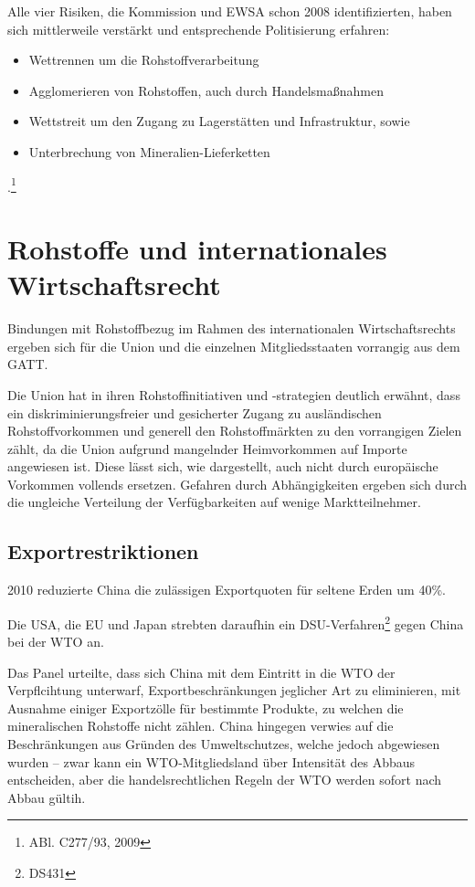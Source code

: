 \documentclass[12pt,a4paper,oneside]{book} %
\begin{document}
{	Alle vier Risiken, die Kommission und EWSA schon 2008 identifizierten, haben sich mittlerweile verstärkt und entsprechende Politisierung erfahren:
	\begin{itemize}
		\item Wettrennen um die Rohstoffverarbeitung
		\item Agglomerieren von Rohstoffen, auch durch Handelsmaßnahmen
		\item Wettstreit um den Zugang zu Lagerstätten und Infrastruktur, sowie
		\item Unterbrechung von Mineralien-Lieferketten
	\end{itemize}
	.\footnote{ABl. C277/93, 2009}
	
	
	
	
	\section{Rohstoffe und internationales Wirtschaftsrecht}
	Bindungen mit Rohstoffbezug im Rahmen des internationalen Wirtschaftsrechts ergeben sich für die Union und die einzelnen Mitgliedsstaaten vorrangig aus dem GATT.
	
	Die Union hat in ihren Rohstoffinitiativen und -strategien deutlich erwähnt, dass ein diskriminierungsfreier und gesicherter Zugang zu ausländischen Rohstoffvorkommen und generell den Rohstoffmärkten zu den vorrangigen Zielen zählt, da die Union aufgrund mangelnder Heimvorkommen auf Importe angewiesen ist. Diese lässt sich, wie dargestellt, auch nicht durch europäische Vorkommen vollends ersetzen. Gefahren durch Abhängigkeiten ergeben sich durch die ungleiche Verteilung der Verfügbarkeiten auf wenige Marktteilnehmer.
	
	\subsection{Exportrestriktionen}
	
	2010 reduzierte China die zulässigen Exportquoten für seltene Erden um 40\%.
	
	Die USA, die EU und Japan strebten daraufhin ein DSU-Verfahren\footnote{DS431}  gegen China bei der WTO an.\autocite{EuZW 2012, 286}
	
	Das Panel urteilte, dass sich China mit dem Eintritt in die WTO der Verpflcihtung unterwarf, Exportbeschränkungen jeglicher Art zu eliminieren, mit Ausnahme einiger Exportzölle für bestimmte Produkte, zu welchen die mineralischen Rohstoffe nicht zählen. China hingegen verwies auf die Beschränkungen aus Gründen des Umweltschutzes, welche jedoch abgewiesen wurden -- zwar kann ein WTO-Mitgliedsland über Intensität des Abbaus entscheiden, aber die handelsrechtlichen Regeln der WTO werden sofort nach Abbau gültih.\autocites{EuZW 2014, 684}{EuZW 2014, 283}
	
}
\end{document}
